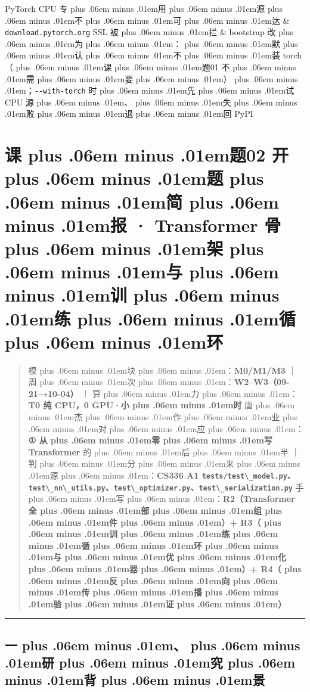 \documentclass[
]{article}
\newcommand{\passthrough}[1]{#1}
\def\zh#1{{\zhfont #1}}
\def\sym#1{{\symfont #1}}
\def\zhglue{\hskip0pt plus .06em minus .01em}
\begin{document}
{\begin{longtable}[]
PyTorch CPU \zh{专\zhglue 用\zhglue 源\zhglue 不\zhglue 可\zhglue 达} & \passthrough{\lstinline!download.pytorch.org!} SSL \zh{被\zhglue 拦} & bootstrap \zh{改\zhglue 为\zhglue ：\zhglue 默\zhglue 认\zhglue 不\zhglue 装} torch\zh{（\zhglue 课\zhglue 题}01 \zh{不\zhglue 需\zhglue 要\zhglue ）\zhglue ；}\passthrough{\lstinline!--with-torch!} \zh{时\zhglue 先\zhglue 试} CPU \zh{源\zhglue 、\zhglue 失\zhglue 败\zhglue 退\zhglue 回} PyPI \\
\end{longtable}
}

\newpage

\section{\zh{课\zhglue 题}02 \zh{开\zhglue 题\zhglue 简\zhglue 报} \sym{·} Transformer \zh{骨\zhglue 架\zhglue 与\zhglue 训\zhglue 练\zhglue 循\zhglue 环}}\label{ux8bfeux989802-ux5f00ux9898ux7b80ux62a5-transformer-ux9aa8ux67b6ux4e0eux8badux7ec3ux5faaux73af}

\begin{quote}
\zh{模\zhglue 块\zhglue ：}\textbf{M0/M1/M3} \zh{｜} \zh{周\zhglue 次\zhglue ：}\textbf{W2--W3\zh{（}09-21\sym{→}10-04\zh{）}} \zh{｜} \zh{算\zhglue 力\zhglue ：}\textbf{T0 \zh{纯} CPU\zh{，}0 GPU\sym{·}\zh{小\zhglue 时}} \zh{唐\zhglue 杰\zhglue 作\zhglue 业\zhglue 对\zhglue 应\zhglue ：}\textbf{\sym{①} \zh{从\zhglue 零\zhglue 写} Transformer} \zh{的\zhglue 后\zhglue 半} \zh{｜} \zh{判\zhglue 分\zhglue 来\zhglue 源\zhglue ：}\textbf{CS336 A1 \passthrough{\lstinline!tests/test\_model.py!}\zh{、}\passthrough{\lstinline!test\_nn\_utils.py!}\zh{、}\passthrough{\lstinline!test\_optimizer.py!}\zh{、}\passthrough{\lstinline!test\_serialization.py!}} \zh{手\zhglue 写\zhglue ：}\textbf{R2\zh{（}Transformer \zh{全\zhglue 部\zhglue 组\zhglue 件\zhglue ）}+ R3\zh{（\zhglue 训\zhglue 练\zhglue 循\zhglue 环\zhglue 与\zhglue 优\zhglue 化\zhglue 器\zhglue ）}+ R4\zh{（\zhglue 反\zhglue 向\zhglue 传\zhglue 播\zhglue 验\zhglue 证\zhglue ）}}
\end{quote}

\begin{center}\rule{0.5\linewidth}{0.5pt}\end{center}

\subsection{\zh{一\zhglue 、\zhglue 研\zhglue 究\zhglue 背\zhglue 景}}\label{ux4e00ux7814ux7a76ux80ccux666f}
\end{document}
